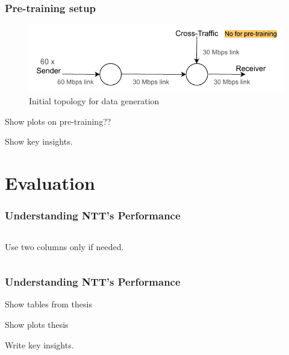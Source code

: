 \documentclass{beamer}
\begin{document}
\begin{frame}
\frametitle{Pre-training setup}


\begin{figure}[h]
  \begin{center}
    \includegraphics[scale=0.8]{figures/simple_topo.pdf}
    \caption{Initial topology for data generation}
    \label{fig:topo}
  \end{center}
\end{figure}
 
 \pause

Show plots on pre-training?? \pause

Show key insights.

\end{frame}




\section{Evaluation}

\begin{frame}
\frametitle{Understanding NTT's Performance}



\begin{columns}
Use two columns 
only if needed.
\end{columns}
\end{frame}


\begin{frame}
\frametitle{Understanding NTT's Performance}

Show tables from thesis \pause 

Show plots thesis \pause

Write key insights.

\end{frame}

\end{document}
